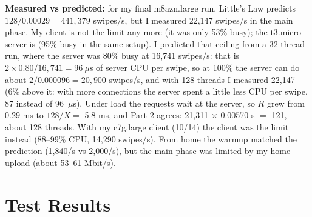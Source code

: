 \documentclass[10pt]{article}
\begin{document}
\textbf{Measured vs predicted:} for my final m8azn.large run, Little's Law predicts $128 / 0.00029 = 441{,}379$ swipes/s, but I measured 22,147 swipes/s in the main phase. My client is not the limit any more (it was only 53\% busy); the t3.micro server is (95\% busy in the same setup). I predicted that ceiling from a 32-thread run, where the server was 80\% busy at 16,741 swipes/s: that is $2 \times 0.80 / 16{,}741 = 96\ \mu$s of server CPU per swipe, so at 100\% the server can do about $2 / 0.000096 = 20{,}900$ swipes/s, and with 128 threads I measured 22,147 (6\% above it: with more connections the server spent a little less CPU per swipe, 87 instead of 96~$\mu$s). Under load the requests wait at the server, so $R$ grew from 0.29 ms to $128 / X =$ 5.8 ms, and Part 2 agrees: 21,311 $\times$ 0.00570 s $=$ 121, about 128 threads. With my c7g.large client (10/14) the client was the limit instead (88--99\% CPU, 14,290 swipes/s). From home the warmup matched the prediction (1,840/s vs 2,000/s), but the main phase was limited by my home upload (about 53--61 Mbit/s).

\label{end-of-design}
\clearpage
\section{Test Results}
\end{document}
